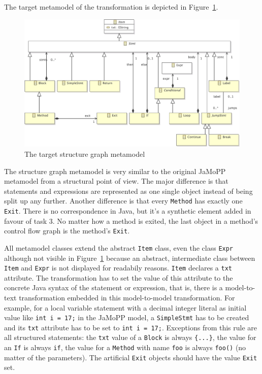 \documentclass[10pt]{article}
\begin{document}
The target metamodel of the transformation is depicted in
Figure~\ref{fig:structure-graph-mm}.

\begin{figure}[h!]
  \centering
  \includegraphics[width=\linewidth]{../metamodel/StructureGraph}
  \caption{The target structure graph metamodel}
  \label{fig:structure-graph-mm}
\end{figure}

The structure graph metamodel is very similar to the original JaMoPP metamodel
from a structural point of view.  The major difference is that statements and
expressions are represented as one single object instead of being split up any
further.  Another difference is that every \verb|Method| has exactly one
\verb|Exit|.  There is no correspondence in Java, but it's a synthetic element
added in favour of task 3.  No matter how a method is exited, the last object
in a method's control flow graph is the method's \verb|Exit|.

All metamodel classes extend the abstract \verb|Item| class, even the class
\verb|Expr| although not visible in Figure~\ref{fig:structure-graph-mm} because
an abstract, intermediate class between \verb|Item| and \verb|Expr| is not
displayed for readabily reasons.  \verb|Item| declares a \verb|txt| attribute.
The transformation has to set the value of this attribute to the concrete Java
syntax of the statement or expression, that is, there is a model-to-text
transformation embedded in this model-to-model transformation.  For example,
for a local variable statement with a decimal integer literal as initial value
like \verb|int i = 17;| in the JaMoPP model, a \verb|SimpleStmt| has to be
created and its \verb|txt| attribute has to be set to \verb|int i = 17;|.
Exceptions from this rule are all structured statements: the \verb|txt| value
of a \verb|Block| is always \verb|{...}|, the value for an \verb|If| is always
\verb|if|, the value for a \verb|Method| with name \verb|foo| is always
\verb|foo()| (no matter of the parameters).  The artificial \verb|Exit| objects
should have the value \verb|Exit| set.
\end{document}
